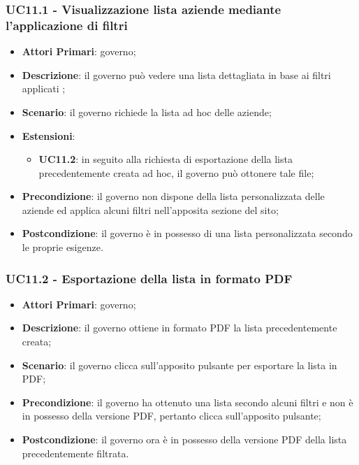  \subsubsection{UC11.1 - Visualizzazione lista aziende mediante l'applicazione di filtri}
 \begin{itemize}
 	\item \textbf{Attori Primari}: governo;
 	\item \textbf{Descrizione}: il governo può vedere una lista dettagliata in base ai filtri applicati ;
 	\item \textbf{Scenario}: il governo richiede la lista ad hoc delle aziende;
 	\item \textbf{Estensioni}:
 	\begin{itemize}
 		\item \textbf{UC11.2}: in seguito alla richiesta di esportazione della lista precedentemente creata ad hoc, il governo può ottonere tale file;
 	\end{itemize}
 	\item \textbf{Precondizione}: il governo non dispone della lista personalizzata delle aziende ed applica alcuni filtri nell'apposita sezione del sito;
 	\item \textbf{Postcondizione}: il governo è in possesso di una lista personalizzata secondo le proprie esigenze.
 \end{itemize}
 \subsubsection{UC11.2 - Esportazione della lista in formato PDF}
 \begin{itemize}
 	\item \textbf{Attori Primari}: governo;
 	\item \textbf{Descrizione}: il governo ottiene in formato PDF la lista precedentemente creata;
 	\item \textbf{Scenario}: il governo clicca sull'apposito pulsante per esportare la lista in PDF;
 	\item \textbf{Precondizione}: il governo ha ottenuto una lista secondo alcuni filtri e non è in possesso della versione PDF, pertanto clicca sull'apposito pulsante;
 	\item \textbf{Postcondizione}: il governo ora è in possesso della versione PDF della lista precedentemente filtrata.
 \end{itemize}
